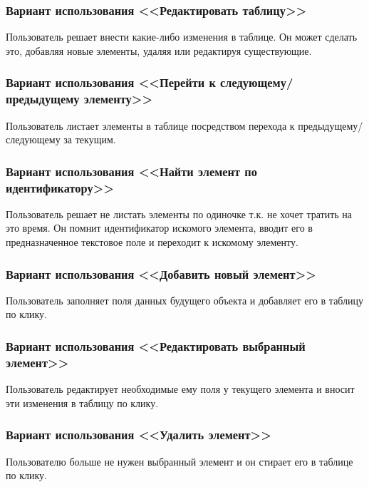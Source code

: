 \subsubsection{Вариант использования <<Редактировать таблицу>>}

Пользователь решает внести какие-либо изменения в таблице. Он может сделать это, добавляя новые элементы, удаляя или редактируя существующие.

\subsubsection{Вариант использования <<Перейти к следующему/предыдущему элементу>>}

Пользователь листает элементы в таблице посредством перехода к предыдущему/следующему за текущим.

\subsubsection{Вариант использования <<Найти элемент по идентификатору>>}

Пользователь решает не листать элементы по одиночке т.к. не хочет тратить на это время. Он помнит идентификатор искомого элемента, вводит его в предназначенное текстовое поле и переходит к искомому элементу.

\subsubsection{Вариант использования <<Добавить новый элемент>>}

Пользователь заполняет поля данных будущего объекта и добавляет его в таблицу по клику.

\subsubsection{Вариант использования <<Редактировать выбранный элемент>>}

Пользователь редактирует необходимые ему поля у текущего элемента и вносит эти изменения в таблицу по клику.

\subsubsection{Вариант использования <<Удалить элемент>>}

Пользователю больше не нужен выбранный элемент и он стирает его в таблице по клику.

